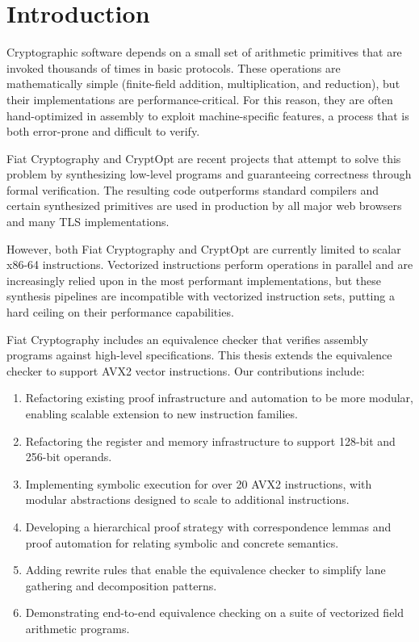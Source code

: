 
\chapter{Introduction}
\label{ch:intro}

Cryptographic software depends on a small set of arithmetic primitives that are invoked thousands of times in basic protocols. These operations are mathematically simple (finite-field addition, multiplication, and reduction), but their implementations are performance-critical. For this reason, they are often hand-optimized in assembly to exploit machine-specific features, a process that is both error-prone and difficult to verify. 

Fiat Cryptography and CryptOpt are recent projects that attempt to solve this problem by synthesizing low-level programs and guaranteeing correctness through formal verification. 
The resulting code outperforms standard compilers and certain synthesized primitives are used in production by all major web browsers and many TLS implementations.

However, both Fiat Cryptography and CryptOpt are currently limited to scalar x86-64 instructions. Vectorized instructions perform operations in parallel and are increasingly relied upon in the most performant implementations, but these synthesis pipelines are incompatible with vectorized instruction sets, putting a hard ceiling on their performance capabilities.

Fiat Cryptography includes an equivalence checker that verifies assembly programs against high-level specifications.
This thesis extends the equivalence checker to support AVX2 vector instructions.
Our contributions include:
\begin{enumerate}
    \item Refactoring existing proof infrastructure and automation to be more modular, enabling scalable extension to new instruction families.
    \item Refactoring the register and memory infrastructure to support 128-bit and 256-bit operands.
    \item Implementing symbolic execution for over 20 AVX2 instructions, with modular abstractions designed to scale to additional instructions.
    \item Developing a hierarchical proof strategy with correspondence lemmas and proof automation for relating symbolic and concrete semantics.
    \item Adding rewrite rules that enable the equivalence checker to simplify lane gathering and decomposition patterns.
\item Demonstrating end-to-end equivalence checking on a suite of vectorized field arithmetic programs.
\end{enumerate}

